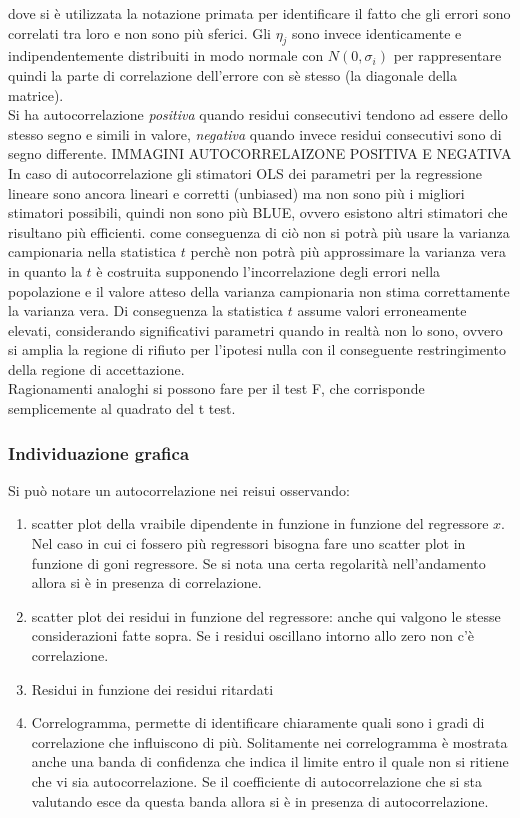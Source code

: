 \documentclass[]{article}
\begin{document}
dove si è utilizzata la notazione primata per identificare il fatto che gli errori sono correlati tra loro e non sono più sferici. Gli $\eta_j$ sono invece identicamente e indipendentemente distribuiti in modo normale con $N(0,\sigma_i)$ per rappresentare quindi la parte di correlazione dell'errore con sè stesso (la diagonale della matrice).\\
Si ha autocorrelazione \textit{positiva} quando residui consecutivi tendono ad essere dello stesso segno e simili in valore, \textit{negativa} quando invece residui consecutivi sono di segno differente.
IMMAGINI AUTOCORRELAIZONE POSITIVA E NEGATIVA
In caso di autocorrelazione gli stimatori OLS  dei parametri per la regressione lineare sono ancora lineari e corretti (unbiased) ma non sono più i migliori stimatori possibili, quindi non sono più BLUE, ovvero esistono altri stimatori che risultano più efficienti. come conseguenza di ciò non si potrà più usare la varianza campionaria nella statistica $t$ perchè non potrà più approssimare la varianza vera in quanto la $t$ è costruita supponendo l'incorrelazione degli errori nella popolazione e il valore atteso della varianza campionaria non stima correttamente la varianza vera. Di conseguenza la statistica $t$ assume valori erroneamente elevati, considerando significativi parametri quando in realtà non lo sono, ovvero si amplia la regione di rifiuto per l'ipotesi nulla con il conseguente restringimento della regione di accettazione. \\
Ragionamenti analoghi si possono fare per il test F, che corrisponde semplicemente al quadrato del t test.
\subsubsection{Individuazione grafica}
Si può notare un autocorrelazione nei reisui osservando:
\begin{enumerate}
	\item scatter plot della vraibile dipendente in funzione in funzione del regressore $x$. Nel caso in cui ci fossero più regressori bisogna fare uno scatter plot in funzione di goni regressore. Se si nota una certa regolarità nell'andamento allora si è in presenza di correlazione.
	\item scatter plot dei residui in funzione del regressore: anche qui valgono le stesse considerazioni fatte sopra. Se i residui oscillano intorno allo zero non c'è correlazione.
	\item Residui in funzione dei residui ritardati
	\item Correlogramma, permette di identificare chiaramente quali sono i gradi di correlazione che influiscono di più. Solitamente nei correlogramma è mostrata anche una banda di confidenza che indica il limite entro il quale non si ritiene che vi sia autocorrelazione. Se il coefficiente di autocorrelazione che si sta valutando esce da questa banda allora si è in presenza di autocorrelazione.
\end{enumerate}
\end{document}
